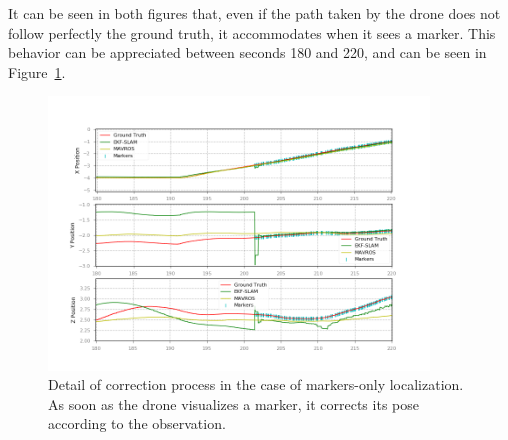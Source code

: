 It can be seen in both figures that, even if the path taken by the drone does not follow perfectly the ground truth, it accommodates when it sees a marker. This behavior can be appreciated between seconds 180 and 220, and can be seen in Figure~\ref{fig:chapter3:simulation:b:real-markers-correction-detail}.
\begin{figure}
    \centering
    \includegraphics[width=0.9\textwidth]{Images/fig21-real-marker-wmap-correction-detail.png}
    \caption[Detail of correction process with markers.]{Detail of correction process in the case of markers-only localization. As soon as the drone visualizes a marker, it corrects its pose according to the observation.}
    \label{fig:chapter3:simulation:b:real-markers-correction-detail}
\end{figure}

